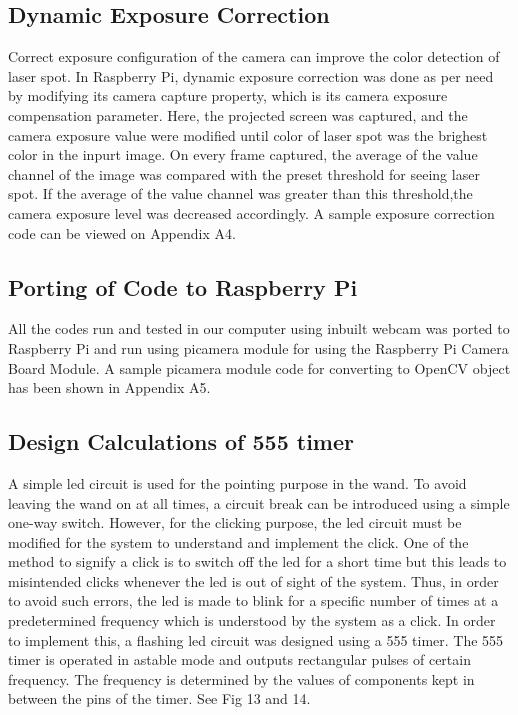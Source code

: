 \documentclass[12pt, a4paper]{article}
\begin{document}
\subsection{Dynamic Exposure Correction}
	Correct exposure configuration of the camera can improve the color detection of laser spot. In Raspberry Pi, dynamic exposure correction was done as per need by modifying its camera capture property, which is its camera exposure compensation parameter. Here, the projected screen was captured, and the camera exposure value were modified until color of laser spot was the brighest color in the inpurt image. On every frame captured, the average of the value channel of the image was compared with the preset threshold for seeing laser spot. If the average of the value channel was greater than this threshold,the camera exposure level was decreased accordingly. A sample exposure correction code can be viewed on Appendix A4.

\subsection{Porting of Code to Raspberry Pi}
	All the codes run and tested in our computer using inbuilt webcam was ported to Raspberry Pi and run using picamera module for using the Raspberry Pi Camera Board Module. A sample picamera module code for converting to OpenCV object has been shown in Appendix A5.

\subsection{Design Calculations of 555 timer}

	A simple led circuit is used for the pointing purpose in the wand. To avoid leaving the wand on at all times, a circuit break can be introduced using a simple one-way switch. However, for the clicking purpose, the led circuit must be modified for the system to understand and implement the click. 
	One of the method to signify a click is to switch off the led for a short time but this leads to misintended clicks whenever the led is out of sight of the system. Thus, in order to avoid such errors, the led is made to blink for a specific number of times at a predetermined frequency which is understood by the system as a click. In order to implement this, a flashing led circuit was designed using a 555 timer. 
	The 555 timer is operated in astable mode and outputs rectangular pulses of certain frequency. The frequency is determined by the values of components kept in between the pins of the timer. See Fig 13 and 14.
\end{document}
